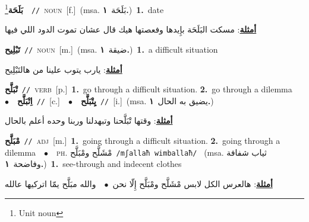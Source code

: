 \documentclass[10pt,a4paper,twoside]{article} %
\begin{document}
\begin{multicols}{2}
{\setlength\topsep{0pt}\textbf{\foreignlanguage{arabic}{بَلَحَة}}\footnote{Unit noun}\ \ {\color{gray}\texttt{//}\color{black}}\ \textsc{noun}\ [f.]\ \color{gray}(msa. \foreignlanguage{arabic}{بَلَحَة}~\foreignlanguage{arabic}{\textbf{١.}})\color{black}\ \textbf{1.}~date\  \begin{flushright}\color{gray}\foreignlanguage{arabic}{\textbf{\underline{\foreignlanguage{arabic}{أمثلة}}}: مسكت البَلَحَة بإِيدها وفعصتها هيك قال عشان تموت الدود اللي فيها}\end{flushright}\color{black}} \vspace{2mm}

{\setlength\topsep{0pt}\textbf{\foreignlanguage{arabic}{تَبْلِيح}}\ {\color{gray}\texttt{//}\color{black}}\ \textsc{noun}\ [m.]\ \color{gray}(msa. \foreignlanguage{arabic}{ضيقة}~\foreignlanguage{arabic}{\textbf{١.}})\color{black}\ \textbf{1.}~a difficult  situation\  \begin{flushright}\color{gray}\foreignlanguage{arabic}{\textbf{\underline{\foreignlanguage{arabic}{أمثلة}}}: يارب يتوب علينا من هالتَبْلِيح}\end{flushright}\color{black}} \vspace{2mm}

{\setlength\topsep{0pt}\textbf{\foreignlanguage{arabic}{تْبَلَّح}}\ {\color{gray}\texttt{//}\color{black}}\ \textsc{verb}\ [p.]\ \textbf{1.}~go through a difficult  situation.  \textbf{2.}~go through a dilemma\ \ $\bullet$\ \ \setlength\topsep{0pt}\textbf{\foreignlanguage{arabic}{اِتْبَلَّح}}\ {\color{gray}\texttt{//}\color{black}}\ [c.]\ \ $\bullet$\ \ \setlength\topsep{0pt}\textbf{\foreignlanguage{arabic}{يِتْبَلَّح}}\ {\color{gray}\texttt{//}\color{black}}\ [i.]\ \color{gray}(msa. \foreignlanguage{arabic}{يضيق به الحال}~\foreignlanguage{arabic}{\textbf{١.}})\color{black}\  \begin{flushright}\color{gray}\foreignlanguage{arabic}{\textbf{\underline{\foreignlanguage{arabic}{أمثلة}}}: وقتها تْبَلَّحنا وتبهدلنا وربنا وحده أعلم بالحال}\end{flushright}\color{black}} \vspace{2mm}

{\setlength\topsep{0pt}\textbf{\foreignlanguage{arabic}{مْبَلَّح}}\ {\color{gray}\texttt{//}\color{black}}\ \textsc{adj}\ [m.]\ \textbf{1.}~going through a difficult  situation.  \textbf{2.}~going through a dilemma\ \ $\bullet$\ \ \textsc{ph.} \color{gray} \foreignlanguage{arabic}{مْشَلَّح ومْبَلَّح}\color{black}\ {\color{gray}\texttt{/{\sffamily mʃallaħ wimballaħ}/}\color{black}}\ \color{gray} (msa. \foreignlanguage{arabic}{ثياب شفافة وفاضحة}~\foreignlanguage{arabic}{\textbf{١.}})\color{black}\ \textbf{1.}~see-through and indecent clothes\  \begin{flushright}\color{gray}\foreignlanguage{arabic}{\textbf{\underline{\foreignlanguage{arabic}{أمثلة}}}: هالعرس الكل لابس مْشَلَّح ومْبَلَّح إِلّا نحن\ $\bullet$\ \  والله مبَلَّح يمّا اتركيها عالله}\end{flushright}\color{black}} \vspace{2mm}


\end{multicols}
\end{document}
